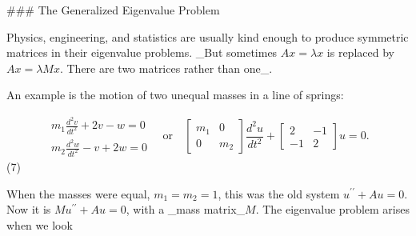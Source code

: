 ### The Generalized Eigenvalue Problem

Physics, engineering, and statistics are usually kind enough to produce symmetric matrices in their eigenvalue problems. _But sometimes \(Ax=\lambda x\) is replaced by \(Ax=\lambda Mx\). There are two matrices rather than one_.

An example is the motion of two unequal masses in a line of springs:

\[\begin{array}{l}m_{1}\frac{d^{2}v}{dt^{2}}+2v-w=0\\ m_{2}\frac{d^{2}w}{dt^{2}}-v+2w=0\end{array}\quad\text{or}\quad\begin{bmatrix} m_{1}&0\\ 0&m_{2}\end{bmatrix}\frac{d^{2}u}{dt^{2}}+\begin{bmatrix}2&-1\\ -1&2\end{bmatrix}u=0.\] (7)

When the masses were equal, \(m_{1}=m_{2}=1\), this was the old system \(u^{\prime\prime}+Au=0\). Now it is \(Mu^{\prime\prime}+Au=0\), with a _mass matrix_\(M\). The eigenvalue problem arises when we look 